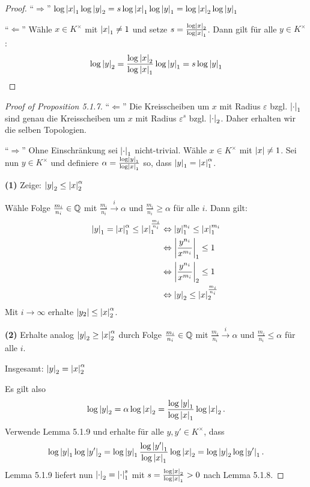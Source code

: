 \begin{proof}
\enquote{$\Rightarrow$}
$\log \left|{x}\right|_1 \log \left|{y}\right|_2 = s \log \left|{x}\right|_1 \log \left|{y}\right|_1 = \log \left|{x}\right|_2 \log \left|{y}\right|_1$
	
\bigskip \enquote{$\Leftarrow$} 
Wähle $x\in K^\times$ mit $\left|{x}\right|_1 \neq 1$ und setze $s = \frac{\log \left|{x}\right|_2}{\log \left|{x}\right|_1}$.
Dann gilt für alle $y \in K^\times$:
\begin{align*}
\log \left|{y}\right| _2 = \frac{\log \left|{x}\right|_2}{\log \left|{x}\right|_1} \log \left|{y}\right| _1
= s \log \left|{y}\right|_1
\end{align*}
\end{proof}


\begin{proof}[Proof of Proposition 5.1.7]
\enquote{$\Leftarrow$}  Die Kreisscheiben um $x$ mit Radius $\varepsilon$ bzgl. $\left|{\cdot}\right|_1$ sind genau die Kreisscheiben um $x$ mit Radius $\varepsilon^s$ bzgl. $\left|{\cdot}\right|_2$.
Daher erhalten wir die selben Topologien.

\bigskip \enquote{$\Rightarrow$} 
Ohne Einschränkung sei $\left|{\cdot}\right|_1$ nicht-trivial. Wähle $x\in K^\times$ mit $\left|{x}\right| \neq 1$.
Sei nun $y \in K^\times$ und definiere $\alpha = \frac{\log \left|{y}\right|_1}{\log \left|{x}\right|_1}$ so, dass
$\left|{y}\right|_1 = \left|{x}\right|_1^\alpha$.

\bigskip
\textbf{(1)} Zeige: $\left|{y}\right|_2 \leq \left|{x}\right|_2^\alpha$

Wähle Folge $\frac{m_i}{n_i} \in \mathbb{Q}$ mit $\frac{m_i}{n_i} \xrightarrow{i} \alpha$ und $\frac{m_i}{n_i} \geq \alpha$ für alle $i$. Dann gilt:
\begin{align*}
\left|{y}\right|_1
= \left|{x}\right|_1^\alpha
\leq \left|{x}\right|_1^{\frac{m_i}{n_i}}
&\Leftrightarrow \left|{y}\right|_1^{n_i}
\leq \left|{x}\right|_1^{m_i} \\
&\Leftrightarrow \left|{\frac{y^{n_i}}{x^{m_i}}}\right|_1 \leq 1 \\
&\Leftrightarrow \left|{\frac{y^{n_i}}{x^{m_i}}}\right|_2 \leq 1 \\
&\Leftrightarrow \left|{y}\right|_2
\leq \left|{x}\right|_2^{\frac{m_i}{n_i}}
\end{align*}
Mit $i \longrightarrow \infty$ erhalte $\left|{y_2}\right| \leq \left|{x}\right|_2^\alpha$.

\bigskip \textbf{(2)} Erhalte analog $\left|{y}\right|_2 \geq \left|{x}\right|_2^\alpha$ durch Folge $\frac{m_i}{n_i} \in \mathbb{Q}$ mit $\frac{m_i}{n_i} \xrightarrow{i} \alpha$ und $\frac{m_i}{n_i} \leq \alpha$ für alle $i$.

\bigskip Insgesamt: $\left|{y}\right|_2 = \left|{x}\right|_2^\alpha$

\bigskip Es gilt also
\[ \log \left|{y}\right|_2 = \alpha \log \left|{x}\right|_2
= \frac{\log \left|{y}\right|_1}{\log \left|{x}\right|_1} \log \left|{x}\right|_2.
\]
Verwende Lemma 5.1.9 und erhalte für alle $y,y' \in K^\times$, dass
\[ \log \left|{y}\right|_1 \log \left|{y'}\right|_2
= \log \left|{y}\right|_1 \frac{\log \left|{y'}\right|_1}{\log \left|{x}\right|_1} \log \left|{x}\right|_2
= \log \left|{y}\right|_2 \log \left|{y'}\right|_1.
\]
Lemma 5.1.9 liefert nun $\left|{\cdot}\right|_2 = \left|{\cdot}\right|_1^s$ mit
$s = \frac{\log \left|{x}\right|_2}{\log \left|{x}\right|_1} >0$ nach Lemma 5.1.8.
\end{proof}

